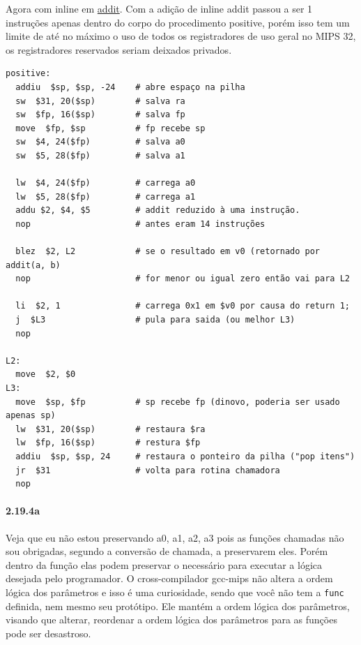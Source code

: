\documentclass{article}
\begin{document}
Agora com inline em \underline{addit}. Com a adição de inline addit passou a
ser 1 instruções apenas dentro do corpo do procedimento positive, porém isso
tem um limite de até no máximo o uso de todos os registradores de uso geral no
MIPS 32, os registradores reservados seriam deixados privados.

\begin{verbatim}
positive:
  addiu  $sp, $sp, -24    # abre espaço na pilha
  sw  $31, 20($sp)        # salva ra
  sw  $fp, 16($sp)        # salva fp
  move  $fp, $sp          # fp recebe sp
  sw  $4, 24($fp)         # salva a0
  sw  $5, 28($fp)         # salva a1

  lw  $4, 24($fp)         # carrega a0
  lw  $5, 28($fp)         # carrega a1
  addu $2, $4, $5         # addit reduzido à uma instrução.
  nop                     # antes eram 14 instruções

  blez  $2, L2            # se o resultado em v0 (retornado por addit(a, b)
  nop                     # for menor ou igual zero então vai para L2

  li  $2, 1               # carrega 0x1 em $v0 por causa do return 1;
  j  $L3                  # pula para saida (ou melhor L3)
  nop

L2:
  move  $2, $0
L3:
  move  $sp, $fp          # sp recebe fp (dinovo, poderia ser usado apenas sp)
  lw  $31, 20($sp)        # restaura $ra
  lw  $fp, 16($sp)        # restura $fp
  addiu  $sp, $sp, 24     # restaura o ponteiro da pilha ("pop itens")
  jr  $31                 # volta para rotina chamadora
  nop
\end{verbatim}

\paragraph{2.19.4a}

Veja que eu não estou preservando a0, a1, a2, a3 pois as funções chamadas não
sou obrigadas, segundo a conversão de chamada, a preservarem eles. Porém dentro
da função elas podem preservar o necessário para executar a lógica desejada
pelo programador. O cross-compilador gcc-mips não altera a ordem lógica dos
parâmetros e isso é uma curiosidade, sendo que você não tem a \verb|func|
definida, nem mesmo seu protótipo. Ele mantém a ordem lógica dos parâmetros,
visando que alterar, reordenar a ordem lógica dos parâmetros para as funções
pode ser desastroso.
\end{document}
